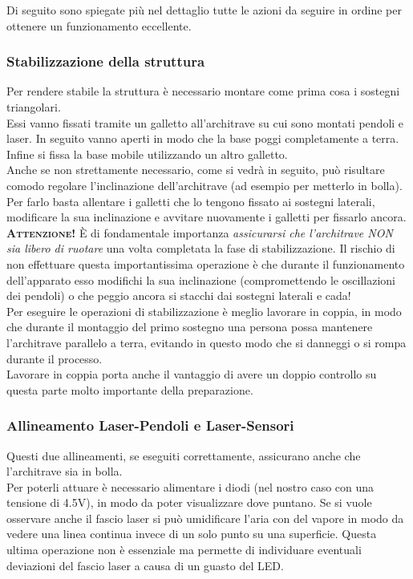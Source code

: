 \documentclass[a4paper]{article}
\begin{document}
Di seguito sono spiegate più nel dettaglio tutte le azioni da seguire in ordine per ottenere un funzionamento eccellente.

\subsubsection*{Stabilizzazione della struttura}

Per rendere stabile la struttura è necessario montare come prima cosa i sostegni triangolari.\\
Essi vanno fissati tramite un galletto all'architrave su cui sono montati pendoli e laser. In seguito vanno aperti in modo che la base poggi completamente a terra. Infine si fissa la base mobile utilizzando un altro galletto.\\
Anche se non strettamente necessario, come si vedrà in seguito, può risultare comodo regolare l'inclinazione dell'architrave (ad esempio per metterlo in bolla). Per farlo basta allentare i galletti che lo tengono fissato ai sostegni laterali, modificare la sua inclinazione e avvitare nuovamente i galletti per fissarlo ancora.\\

\textbf{\textsc{Attenzione!}} È di fondamentale importanza \emph{assicurarsi che l'architrave NON sia libero di ruotare} una volta completata la fase di stabilizzazione. Il rischio di non effettuare questa importantissima operazione è che durante il funzionamento dell'apparato esso modifichi la sua inclinazione (compromettendo le oscillazioni dei pendoli) o che peggio ancora si stacchi dai sostegni laterali e cada!\\

Per eseguire le operazioni di stabilizzazione è meglio lavorare in coppia, in modo che durante il montaggio del primo sostegno una persona possa mantenere l'architrave parallelo a terra, evitando in questo modo che si danneggi o si rompa durante il processo.\\
Lavorare in coppia porta anche il vantaggio di avere un doppio controllo su questa parte molto importante della preparazione.

\subsubsection*{Allineamento Laser-Pendoli e Laser-Sensori}

Questi due allineamenti, se eseguiti correttamente, assicurano anche che l'architrave sia in bolla.\\
Per poterli attuare è necessario alimentare i diodi (nel nostro caso con una tensione di 4.5V), in modo da poter visualizzare dove puntano. Se si vuole osservare anche il fascio laser si può umidificare l'aria con del vapore in modo da vedere una linea continua invece di un solo punto su una superficie. Questa ultima operazione non è essenziale ma permette di individuare eventuali deviazioni del fascio laser a causa di un guasto del LED.\\
\end{document}

